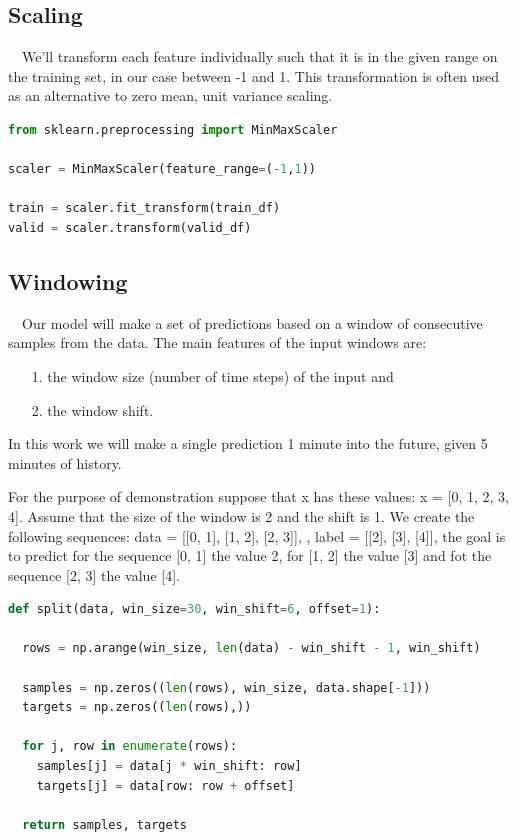 \subsection*{Scaling}\label{Scaling}

~~We'll transform each feature individually such that it is in the given range on the training set, in our case between -1 and 1. This transformation is often used as an alternative to zero mean, unit variance scaling.

\begin{lstlisting}[language=Python]
from sklearn.preprocessing import MinMaxScaler

scaler = MinMaxScaler(feature_range=(-1,1))

train = scaler.fit_transform(train_df)
valid = scaler.transform(valid_df)
\end{lstlisting}

\subsection*{Windowing}\label{Windowing}

~~Our model will make a set of predictions based on a window of consecutive samples from the data. The main features of the input windows are:

\begin{itemize}
  \item[1.] the window size (number of time steps) of the input and
  \item[2.] the window shift.
\end{itemize}

In this work we will make a single prediction 1 minute into the future, given 5 minutes of history. 

For the purpose of demonstration suppose that x has these values: x = [0, 1, 2, 3, 4]. Assume that the size of the window is 2 and the shift is 1. We create the following sequences: data = [[0, 1], [1, 2], [2, 3]], , label = [[2], [3], [4]], the goal is to predict for the sequence [0, 1] the value 2, for [1, 2] the value [3] and fot the sequence [2, 3] the value [4].


\begin{lstlisting}[language=Python]
def split(data, win_size=30, win_shift=6, offset=1):

  rows = np.arange(win_size, len(data) - win_shift - 1, win_shift)

  samples = np.zeros((len(rows), win_size, data.shape[-1]))
  targets = np.zeros((len(rows),))

  for j, row in enumerate(rows):
    samples[j] = data[j * win_shift: row]
    targets[j] = data[row: row + offset]

  return samples, targets
\end{lstlisting}





